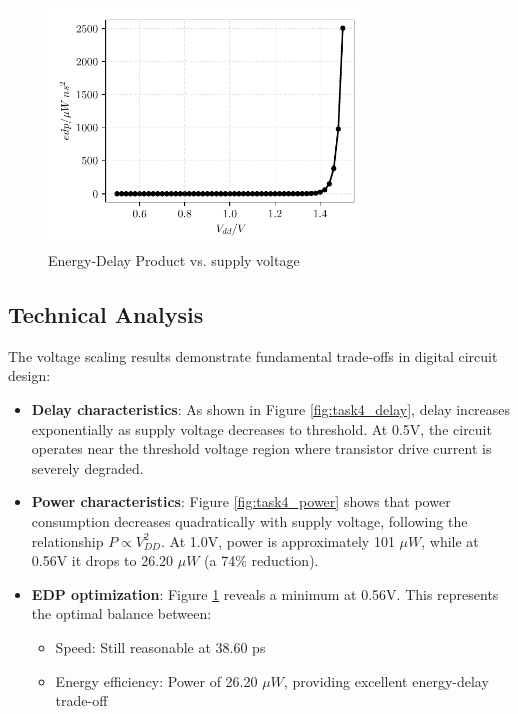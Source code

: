 \documentclass[UTF8,12pt,a4paper]{ctexart}
\begin{document}
\begin{figure}[h]
\centering
\includegraphics[width=0.75\textwidth]{Task4/edp_vs_volts.pdf}
\caption{Energy-Delay Product vs. supply voltage}
\label{fig:task4_edp}
\end{figure}

\subsection{Technical Analysis}

The voltage scaling results demonstrate fundamental trade-offs in digital circuit design:

\begin{itemize}
    \item[1.] \textbf{Delay characteristics}: As shown in Figure \ref{fig:task4_delay}, delay increases exponentially as supply voltage decreases to threshold. At 0.5V, the circuit operates near the threshold voltage region where transistor drive current is severely degraded.
    
    \item[2.] \textbf{Power characteristics}: Figure \ref{fig:task4_power} shows that power consumption decreases quadratically with supply voltage, following the relationship $P \propto V_{DD}^2$. At 1.0V, power is approximately 101 $\mu W$, while at 0.56V it drops to 26.20 $\mu W$ (a 74\% reduction).
    
    \item[3.] \textbf{EDP optimization}: Figure \ref{fig:task4_edp} reveals a minimum at 0.56V. This represents the optimal balance between:
    \begin{itemize}
        \item Speed: Still reasonable at 38.60 ps
        \item Energy efficiency: Power of 26.20 $\mu W$, providing excellent energy-delay trade-off
    \end{itemize}
    
\end{itemize}
\end{document}
